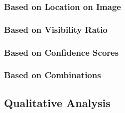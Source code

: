 \documentclass[12pt, oneside]{article}
\begin{document}
\subsubsection{Based on Location on Image}
\subsubsection{Based on Visibility Ratio}
\subsubsection{Based on Confidence Scores}
\subsubsection{Based on Combinations}

\subsection{Qualitative Analysis}
\end{document}
